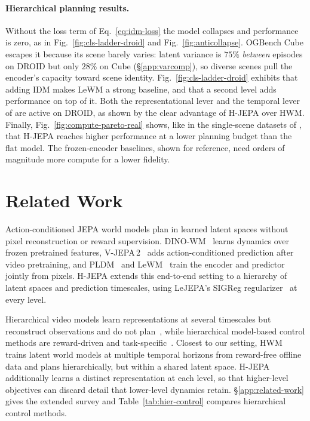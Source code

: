 \paragraph{Hierarchical planning results.}
Without the loss term of
Eq.~\eqref{eq:idm-loss} the model collapses and performance is zero, as in Fig.~\ref{fig:cls-ladder-droid} and Fig.~\ref{fig:anticollapse}.
OGBench Cube escapes it because its scene barely varies: latent variance is $75\%$ \emph{between} episodes on DROID but only $28\%$ on Cube (\S\ref{app:varcomp}), so diverse scenes pull the encoder's capacity toward scene identity.
Fig.~\ref{fig:cls-ladder-droid} exhibits that adding IDM makes LeWM a strong baseline, and that a second level adds performance on top of it. Both
the representational lever and the temporal lever of  are active on DROID, as shown by the clear advantage of H-JEPA over HWM. Finally, Fig.~\ref{fig:compute-pareto-real} shows, like in the single-scene datasets of
, that H-JEPA reaches higher performance at a lower
planning budget than the flat model. The frozen-encoder baselines, shown for reference, need orders of magnitude more compute for a lower fidelity.

\section{Related Work}
\label{sec:related}

Action-conditioned JEPA world models plan in learned latent spaces without
pixel reconstruction or reward supervision. DINO-WM~\citep{zhou2025dinowm}
learns dynamics over frozen pretrained features, V-JEPA\,2~\citep{assran2025vjepa2}
adds action-conditioned prediction after video pretraining, and
PLDM~\citep{sobal2025pldm} and LeWM~\citep{maes2026lewm} train the encoder and
predictor jointly from pixels. H-JEPA extends this end-to-end setting to a
hierarchy of latent spaces and prediction timescales, using LeJEPA's SIGReg
regularizer~\citep{balestriero2025lejepa} at every level.

Hierarchical video models learn representations at several timescales but
reconstruct observations and do not plan~\citep{saxena2021clockwork,kim2019vta,mounir2023streamer},
while hierarchical model-based control methods are reward-driven and
task-specific~\citep{hafner2022director,hansen2025puppeteer,gumbsch2024thick}.
Closest to our setting, HWM~\citep{zhang2026hierarchical} trains latent world
models at multiple temporal horizons from reward-free offline data and plans
hierarchically, but within a shared latent space.
H-JEPA additionally learns a distinct representation at each level, so that
higher-level objectives can discard detail that lower-level dynamics retain.
\S\ref{app:related-work} gives the extended survey and
Table~\ref{tab:hier-control} compares hierarchical control methods.

